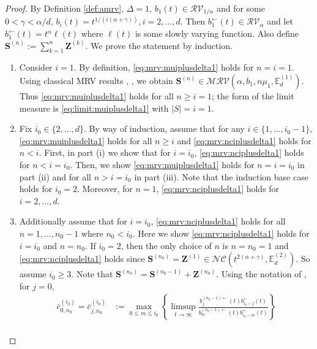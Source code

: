 \documentclass[aos]{imsart}
\numberwithin{equation}{section}
\theoremstyle{plain} %
\theoremstyle{remark}
\newcommand{\E}{\mathbb{E}}
\def\MRV{\mathcal{MRV}}
\def\RV{\mathcal{RV}}
\def\bS{\boldsymbol{S}}
\def\bZ{\boldsymbol Z}
\begin{document}
\begin{proof}
By Definition \ref{def:amrv}, $\Delta=1$, $b_1(t)\in \RV_{1/\alpha}$ and for some $0<\gamma<\alpha/d$, $b_i(t)= t^{1/(i(\alpha+\gamma))}, i=2,\ldots, d$. Then $b_1^{\leftarrow}(t)\in \RV_{\alpha}$ and let $b_1^{\leftarrow}(t)=t^{\alpha}\ell(t)$ where $\ell(t)$ is some slowly varying function. Also define $\bS^{(n)}:=\sum_{k=1}^n\bZ^{(k)}$. We prove the statement by induction.
\begin{enumerate}[(1)]
\item Consider $i=1$. By definition, \eqref{eq:mrv:muiplusdelta1} holds for $n=i=1$. Using
classical MRV results \cite[Theorem 1.30]{lindskog:2004thesis}, \citep[Example 3.2]{hult:samorodnitsky:2007}, we obtain $\bS^{(n)}\in \MRV(\alpha,b_1,n\mu_{1},\E_d^{(1)})$. Thus \eqref{eq:mrv:muiplusdelta1} holds for all $n\ge i=1$; the form of the limit measure is \eqref{eq:limit:muiplusdelta1} with $|S|=i=1$.
\item  Fix $i_0\in \{2,\ldots,d\}$. By way of induction, assume that for any $i\in \{1,\ldots,i_0-1\}$, \eqref{eq:mrv:muiplusdelta1} holds for all $n\ge i$ and \eqref{eq:mrv:nciplusdelta1} holds  for $n<i$. First, in part (i) we show that for $i=i_0$, \eqref{eq:mrv:nciplusdelta1}  holds for $n<i=i_0$. Then, we show \eqref{eq:mrv:muiplusdelta1} holds  for $n=i=i_0$ in part (ii) and for all $n> i=i_0$ in part (iii).
Note that the induction base case holds for $i_0=2$. Moreover, for $n=1$, \eqref{eq:mrv:nciplusdelta1} holds for $i=2,\ldots,d$.
\item[(i)] Additionally assume that for $i=i_0$, \eqref{eq:mrv:nciplusdelta1} holds for all $n=1,\ldots, n_0-1$ where $n_0<i_0$. Here we show \eqref{eq:mrv:nciplusdelta1} holds for $i=i_0$ and $n=n_0$. If $i_0=2$, then the only choice of $n$ is  $n=n_0=1$ and \eqref{eq:mrv:nciplusdelta1} holds since $\bS^{(n_0)}=\bZ^{(1)}\in \mathcal{NC}(t^{2(\alpha+\gamma)},\E_d^{(2)})$.  So assume $i_0\ge 3$. Note that $\bS^{(n_0)}=\bS^{(n_0-1)}+\bZ^{(n_0)}$. Using the notation of , for $j=0$,
\begin{align*}
\bar{c}_{0,n_0}^{(i_0)}=\bar{c}_{j,n_0}^{(i_0)}&:=\max_{0\le m\le i_0}\left\{\limsup_{t\to\infty} \frac{b_{j}^{(n_0-1)\leftarrow}(t)b_{i_0-j}^{\leftarrow}(t)}{b_{m}^{(n_0-1)\leftarrow}(t)b_{i_0-m}^{\leftarrow}(t)} \right\} \\

\end{align*}
\end{enumerate}
\end{proof}
\end{document}
